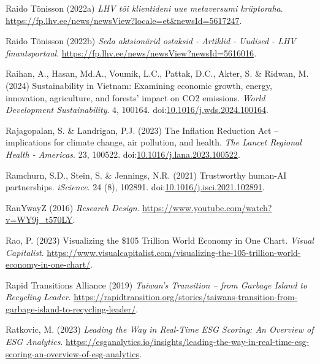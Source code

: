 \documentclass[
  letterpaper,
  DIV=11,
  numbers=noendperiod]{scrartcl}
\newlength{\cslhangindent}
\newenvironment{CSLReferences}[2] %
 {\begin{list}{}{%
  \setlength{\itemindent}{0pt}
  \setlength{\leftmargin}{0pt}
  \setlength{\parsep}{0pt}
  \ifodd #1
   \setlength{\leftmargin}{\cslhangindent}
   \setlength{\itemindent}{-1\cslhangindent}
  \fi
  \setlength{\itemsep}{#2\baselineskip}}}
 {\end{list}}
\begin{document}
\begin{CSLReferences}{0}{1}
Raido Tõnisson (2022a) \emph{{LHV} t{õ}i klientideni uue metaversumi
kr{ü}ptoraha}.
\url{https://fp.lhv.ee/news/newsView?locale=et&newsId=5617247}.

Raido Tõnisson (2022b) \emph{Seda aktsion{ä}rid ostaksid - {Artiklid} -
{Uudised} - {LHV} finantsportaal}.
\url{https://fp.lhv.ee/news/newsView?newsId=5616016}.

Raihan, A., Hasan, Md.A., Voumik, L.C., Pattak, D.C., Akter, S. \&
Ridwan, M. (2024) Sustainability in {Vietnam}: {Examining} economic
growth, energy, innovation, agriculture, and forests' impact on {CO2}
emissions. \emph{World Development Sustainability}. 4, 100164.
doi:\href{https://doi.org/10.1016/j.wds.2024.100164}{10.1016/j.wds.2024.100164}.

Rajagopalan, S. \& Landrigan, P.J. (2023) The {Inflation Reduction Act}
-- implications for climate change, air pollution, and health. \emph{The
Lancet Regional Health - Americas}. 23, 100522.
doi:\href{https://doi.org/10.1016/j.lana.2023.100522}{10.1016/j.lana.2023.100522}.

Ramchurn, S.D., Stein, S. \& Jennings, N.R. (2021) Trustworthy
human-{AI} partnerships. \emph{iScience}. 24 (8), 102891.
doi:\href{https://doi.org/10.1016/j.isci.2021.102891}{10.1016/j.isci.2021.102891}.

RanYwayZ (2016) \emph{Research {Design}}.
\url{https://www.youtube.com/watch?v=WY9j_t570LY}.

Rao, P. (2023) Visualizing the \$105 {Trillion World Economy} in {One
Chart}. \emph{Visual Capitalist}.
\url{https://www.visualcapitalist.com/visualizing-the-105-trillion-world-economy-in-one-chart/}.

Rapid Transitions Alliance (2019) \emph{Taiwan's {Transition} -- from
{Garbage Island} to {Recycling Leader}}.
\url{https://rapidtransition.org/stories/taiwans-transition-from-garbage-island-to-recycling-leader/}.

Ratkovic, M. (2023) \emph{Leading the {Way} in {Real-Time ESG Scoring}:
{An Overview} of {ESG Analytics}}.
\url{https://esganalytics.io/insights/leading-the-way-in-real-time-esg-scoring-an-overview-of-esg-analytics}.


\end{CSLReferences}
\end{document}
